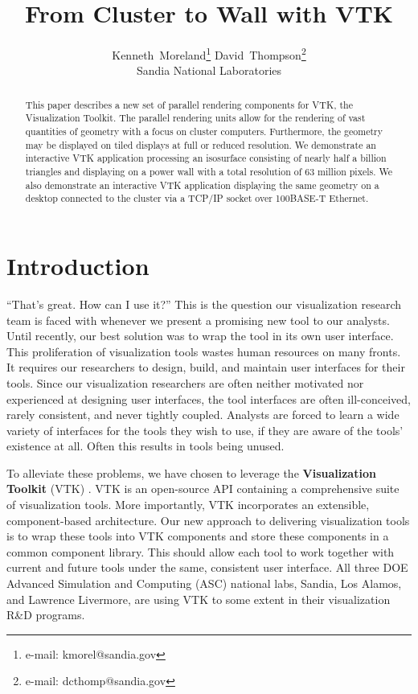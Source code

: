 \documentclass[letterpaper]{acmsiggraph}
\title{From Cluster to Wall with VTK}
\author{Kenneth~Moreland\thanks{e-mail: kmorel@sandia.gov} \hspace{.2in}
  David~Thompson\thanks{e-mail: dcthomp@sandia.gov}
  \\ Sandia National Laboratories}
\newcommand{\keyterm}[1]{\textbf{#1}}
\begin{document}
  \maketitle

  \begin{abstract}
    This paper describes a new set of parallel rendering components for
    VTK, the Visualization Toolkit.  The parallel rendering units allow for
    the rendering of vast quantities of geometry with a focus on cluster
    computers.  Furthermore, the geometry may be displayed on tiled
    displays at full or reduced resolution.  We demonstrate an interactive
    VTK application processing an isosurface consisting of nearly half a
    billion triangles and displaying on a power wall with a total
    resolution of 63 million pixels.  We also demonstrate an interactive
    VTK application displaying the same geometry on a desktop connected to
    the cluster via a TCP/IP socket over 100BASE-T Ethernet.
  \end{abstract}

  \begin{CRcatlist}
  \end{CRcatlist}

  \keywordlist

  \copyrightspace

  \section{Introduction}
  \label{sec:introduction}

  ``That's great.  How can I use it?''  This is the question our
  visualization research team is faced with whenever we present a promising
  new tool to our analysts.  Until recently, our best solution was to wrap
  the tool in its own user interface.  This proliferation of visualization
  tools wastes human resources on many fronts.  It requires our researchers
  to design, build, and maintain user interfaces for their tools.  Since
  our visualization researchers are often neither motivated nor experienced
  at designing user interfaces, the tool interfaces are often
  ill-conceived, rarely consistent, and never tightly coupled.  Analysts
  are forced to learn a wide variety of interfaces for the tools they wish
  to use, if they are aware of the tools' existence at all.  Often this
  results in tools being unused.

  To alleviate these problems, we have chosen to leverage the
  \keyterm{Visualization Toolkit} (VTK) \cite{Schroeder02}.  VTK is an
  open-source API containing a comprehensive suite of visualization tools.
  More importantly, VTK incorporates an extensible, component-based
  architecture.  Our new approach to delivering visualization tools is to
  wrap these tools into VTK components and store these components in a
  common component library.  This should allow each tool to work together
  with current and future tools under the same, consistent user interface.
  All three DOE Advanced Simulation and Computing (ASC) national labs,
  Sandia, Los Alamos, and Lawrence Livermore, are using VTK to some extent
  in their visualization R\&D programs.
\end{document}
